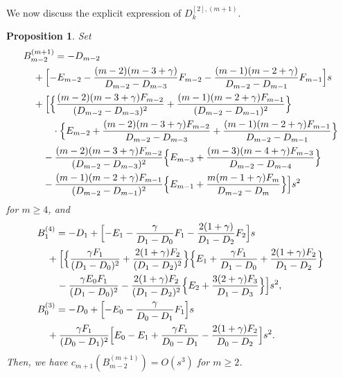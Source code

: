 \documentclass[12pt]{amsart}
\numberwithin{equation}{section}
\newtheorem{prop}[thm]{Proposition}
\theoremstyle{definition}
\theoremstyle{remark}
\begin{document}
We now discuss the explicit expression of $D_k^{[2],(m+1)}$.
\begin{prop}
Set
\begin{align}
& B_{m-2}^{(m+1)} = -D_{m-2} \label{eq:Bm+1m-2} \\
& \quad + \Bigl[ -E_{m-2}-\frac{(m-2)(m-3+\gamma)}{D_{m-2}-D_{m-3}}F_{m-2}-\frac{(m-1)(m-2+\gamma)}{D_{m-2}-D_{m-1}}F_{m-1}\Bigr] s \nonumber \\
& \quad + \Bigl[ \Bigl\{ \frac{(m-2)(m-3+\gamma) F_{m-2} }{(D_{m-2}-D_{m-3})^2} + \frac{(m-1)(m-2+\gamma) F_{m-1}}{(D_{m-2}-D_{m-1})^2} \Bigr\} \nonumber \\
& \quad \qquad \cdot \Bigl\{ E_{m-2} + \frac{(m-2)(m-3+\gamma) F_{m-2} }{D_{m-2}-D_{m-3}} + \frac{(m-1)(m-2+\gamma) F_{m-1}}{D_{m-2}-D_{m-1}} \Bigr\} \nonumber \\
& \quad \quad - \frac{(m-2)(m-3+\gamma) F_{m-2} }{(D_{m-2}-D_{m-3})^2} \Bigl\{ E_{m-3}+\frac{(m-3)(m-4+\gamma) F_{m-3}}{D_{m-2}-D_{m-4}} \Bigr\} \nonumber \\
& \quad \quad - \frac{(m-1)(m-2+\gamma) F_{m-1}}{(D_{m-2}-D_{m-1})^2} \Bigl\{ E_{m-1}+\frac{m(m-1+\gamma) F_{m}}{D_{m-2}-D_{m}} \Bigr\} \Bigr] s^2 \nonumber 
\end{align}
for $m \geq 4$, and
\begin{align}
& B_{1}^{(4)} = -D_{1} + \Bigl[ -E_{1}-\frac{\gamma}{D_{1}-D_{0}}F_{1}-\frac{2(1+\gamma)}{D_{1}-D_{2}}F_{2}\Bigr] s \\
& \quad + \Bigl[ \Bigl\{ \frac{\gamma F_{1} }{(D_{1}-D_{0})^2} + \frac{2(1+\gamma) F_{2}}{(D_{1}-D_{2})^2} \Bigr\}  \Bigl\{ E_{1} + \frac{\gamma F_{1} }{D_{1}-D_{0}} + \frac{2(1+\gamma) F_{2}}{D_{1}-D_{2}} \Bigr\} \nonumber \\
& \quad \quad - \frac{\gamma E_{0} F_{1} }{(D_{1}-D_{0})^2}  - \frac{2(1+\gamma) F_{2}}{(D_{1}-D_{2})^2} \Bigl\{ E_{2}+\frac{3(2+\gamma) F_{3}}{D_{1}-D_{3}} \Bigr\} \Bigr] s^2 , \nonumber \\
& B_{0}^{(3)} = -D_{0} + \Bigl[ -E_{0}-\frac{\gamma}{D_{0}-D_{1}}F_{1}\Bigr] s \\
& \quad + \frac{\gamma F_{1}}{(D_{0}-D_{1})^2} \Bigl[ E_{0} - E_{1} + \frac{\gamma F_{1}}{D_{0}-D_{1}}  - \frac{2(1+\gamma) F_{2}}{D_{0}-D_{2}} \Bigr] s^2 . \nonumber 
\end{align}
Then, we have $c_{m+1} (B_{m-2}^{(m+1)}) = O(s^3) $ for $m \geq 2$.
\end{prop}
\end{document}
